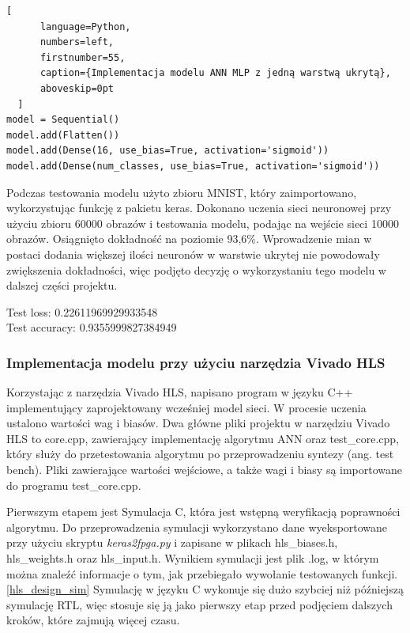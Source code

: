 \begin{addmargin}[10mm]{0mm}
  \begin{lstlisting}[
      language=Python,
      numbers=left,
      firstnumber=55,
      caption={Implementacja modelu ANN MLP z jedną warstwą ukrytą},
      aboveskip=0pt
  ]
model = Sequential()
model.add(Flatten())
model.add(Dense(16, use_bias=True, activation='sigmoid'))
model.add(Dense(num_classes, use_bias=True, activation='sigmoid'))

  \end{lstlisting}
  \end{addmargin}


Podczas testowania modelu użyto zbioru MNIST, który zaimportowano, wykorzystując
funkcję z pakietu keras. Dokonano uczenia sieci neuronowej przy użyciu zbioru 60000 
obrazów i testowania modelu, podając na wejście sieci 10000 obrazów. Osiągnięto 
dokładność na poziomie 93,6\%. 
Wprowadzenie mian w postaci dodania większej ilości neuronów w warstwie ukrytej nie 
powodowały zwiększenia dokładności, więc podjęto decyzję o wykorzystaniu tego modelu 
w dalszej części projektu.

Test loss: 0.22611969929933548\\
Test accuracy: 0.9355999827384949


\subsubsection{Implementacja modelu przy użyciu narzędzia Vivado HLS}

Korzystając z narzędzia Vivado HLS, napisano program w języku C++ implementujący 
zaprojektowany wcześniej model sieci. W procesie uczenia ustalono wartości wag i 
biasów. Dwa główne pliki projektu w narzędziu Vivado HLS to core.cpp, zawierający 
implementację algorytmu ANN oraz test\_core.cpp, który służy do przetestowania
algorytmu po przeprowadzeniu syntezy (ang. test bench).   
Pliki zawierające wartości wejściowe, a także wagi i biasy są importowane 
do programu test\_core.cpp. 

Pierwszym etapem jest Symulacja C, która jest wstępną weryfikacją poprawności
algorytmu. Do przeprowadzenia symulacji wykorzystano dane wyeksportowane przy użyciu 
skryptu \emph{keras2fpga.py} i zapisane w plikach hls\_biases.h, hls\_weights.h oraz 
hls\_input.h. Wynikiem symulacji jest plik .log, w którym można znaleźć informacje o
tym, jak przebiegało wywołanie testowanych funkcji.\ref{hls_design_sim}
Symulację w języku C wykonuje się dużo szybciej niż późniejszą symulację RTL, więc
stosuje się ją jako pierwszy etap przed podjęciem dalszych kroków, które zajmują 
więcej czasu.

